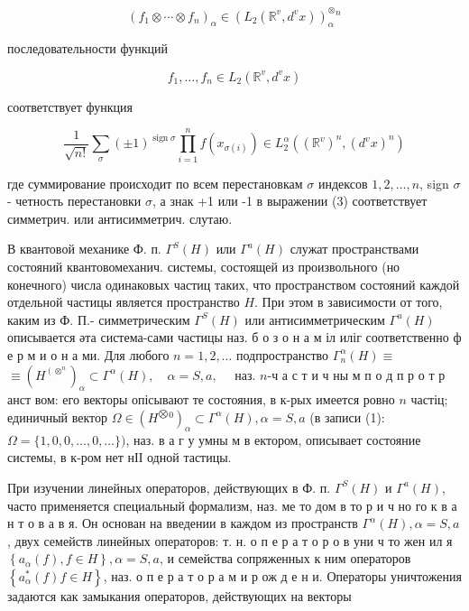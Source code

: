 \documentclass[10pt]{article}
\begin{document}
\[

\left(f_{1} \otimes \cdots \otimes f_{n}\right)_{\alpha} \in\left(L_{2}\left(\mathbb{R}^{v}, d^{v} x\right)\right)_{\alpha}^{\otimes}{ }^{n}

\]



последовательности функций



\[

f_{1}, \ldots, f_{n} \in L_{2}\left(\mathbb{R}^{v}, d^{v} x\right)

\]



соответствует функция



\[

\frac{1}{\sqrt{n !}} \sum_{\sigma}( \pm 1)^{\operatorname{sign} \sigma} \prod_{i=1}^{n} f\left(x_{\sigma(i)}\right) \in L_{2}^{\alpha}\left(\left(\mathbb{R}^{v}\right)^{n},\left(d^{v} x\right)^{n}\right)

\]



где суммирование происходит по всем перестановкам $\sigma$ индексов $1,2, \ldots, n$, sign $\sigma$ - четность перестановки $\sigma$, а знак +1 или -1 в выражении (3) соответствует симметрич. или антисимметрич. слутаю.



В квантовой механике Ф. п. $\Gamma^{S}(H)$ или $\Gamma^{a}(H)$ служат пространствами состояний квантовомеханич. системы, состоящей из произвольного (но конечного) числа одинаковых частиц таких, что пространством состояний каждой отдельной частицы является пространство $H$. При этом в зависимости от того, каким из Ф. П.- симметрическим $\Gamma^{S}(H)$ или антисимметрическим $\Gamma^{u}(H)$ описывается әта система-сами частицы наз. б о з о н а м іл иліг соответственно ф е р м и о н а ми. Для любого $n=1,2, \ldots$ подпространство $\Gamma_{n}^{\alpha}(H) \equiv$ $\equiv\left(H^{\left(\otimes^{n}\right.}\right)_{\alpha} \subset \Gamma^{\alpha}(H), \quad \alpha=S, a, \quad$ наз. $n$-ч а с т и ч ны м п о д п р о т р анст вом: его векторы опісывают те состояния, в к-рых имеется ровно $n$ частіц; единичный вектор $\Omega \in\left(H^{\bigotimes}{ }^{0}\right)_{\alpha} \subset \Gamma^{\alpha}(H), \alpha=S, a$ (в записи (1): $\Omega=\{1,0,0, \ldots, 0, \ldots\})$, наз. в а г у умны м в ектором, описывает состояние системы, в к-ром нет нІІ одной тастицы.



При изучении линейных операторов, действующих в Ф. п. $\Gamma^{S}(H)$ и $\Gamma^{a}(H)$, часто применяется специальный формализм, наз. ме то дом в то р и ч но го к в а н т о в а в я. Он основан на введении в каждом из пространств $\Gamma^{\alpha}(H), \alpha=S, a$, двух семейств линейных операторов: т. н. о п е р а т о р о в уни ч то жен ил я $\left\{a_{\alpha}(f), f \in H\right\}, \alpha=S, a$, и семейства сопряженных к ним операторов $\left\{a_{\alpha}^{*}(f) f \in H\right\}$, наз. о п е р а т о р а м и р ож д е н и. Операторы уничтожения задаются как замыкания операторов, действующих на векторы
\end{document}
